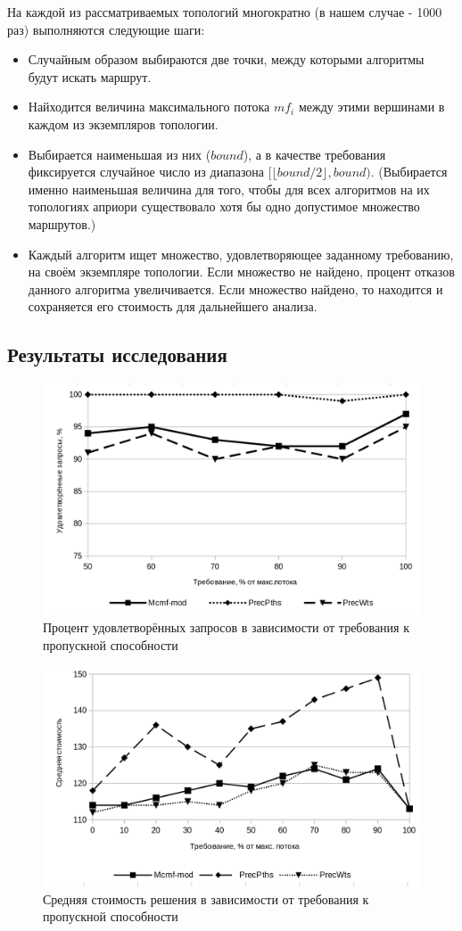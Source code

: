 \documentclass[a4paper]{article}
\begin{document}
На каждой из рассматриваемых топологий многократно (в нашем случае - 1000 раз) выполняются следующие шаги:
\begin{itemize}
\item Случайным образом выбираются две точки, между которыми алгоритмы будут искать маршрут.
\item Найходится величина максимального потока $mf_i$ между этими вершинами в каждом из экземпляров топологии.
\item Выбирается наименьшая из них ($bound$), а в качестве требования фиксируется случайное число из диапазона $[\lfloor bound/2 \rfloor, bound)$. (Выбирается именно наименьшая величина для того, чтобы для всех алгоритмов на их топологиях априори существовало хотя бы одно допустимое множество маршрутов.)
\item Каждый алгоритм ищет множество, удовлетворяющее заданному требованию, на своём экземпляре топологии. Если множество не найдено, процент отказов данного алгоритма увеличивается. Если множество найдено, то находится и сохраняется его стоимость для дальнейшего анализа.
\end{itemize}

\subsection{Результаты исследования}

\begin{figure}[H]
     \centering
     \includegraphics[width=.65\linewidth]{ch1.png}
     \caption{Процент удовлетворённых запросов в зависимости от требования к пропускной способности}\label{Fig:Chart5}
\end{figure}

\begin{figure}[H]
     \centering
     \includegraphics[width=.65\linewidth]{ch2.png}
     \caption{Средняя стоимость решения в зависимости от требования к пропускной способности}\label{Fig:Chart6}
\end{figure}
\end{document}
